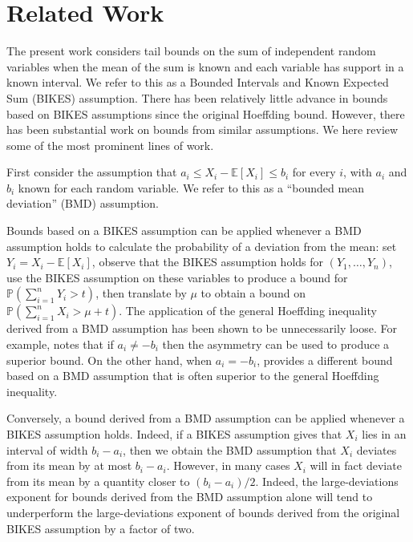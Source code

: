 \documentclass[12pt]{article}
\theoremstyle{plain}
\begin{document}
\section{Related Work}
\label{sec:related}

The present work considers tail bounds on the sum of independent random variables when the mean of the sum is known and each variable has support in a known interval.  We refer to this as a Bounded Intervals and Known Expected Sum (BIKES) assumption.  There has been relatively little advance in bounds based on BIKES assumptions since the original Hoeffding bound.  However, there has been substantial work on bounds from similar assumptions.  We here review some of the most prominent lines of work.

First consider the assumption that $a_i \leq X_i - \mathbb{E}[X_i] \leq b_i$ for every $i$, with $a_i$ and $b_i$ known for each random variable.  We refer to this as a ``bounded mean deviation'' (BMD) assumption.

Bounds based on a BIKES assumption can be applied whenever a BMD assumption holds to calculate the probability of a deviation from the mean: set $Y_i = X_i - \mathbb{E}[X_i]$, observe that the BIKES assumption holds for $(Y_1,\ldots,Y_n)$, use the BIKES assumption on these variables to produce a bound for $\mathbb{P}(\sum_{i=1}^n Y_i > t)$, then translate by $\mu$ to obtain a bound on $\mathbb{P}(\sum_{i=1}^n X_i > \mu+t)$.  The application of the general Hoeffding inequality derived from a BMD assumption has been shown to be unnecessarily loose.  For example, \citet{hertz2020improved} notes that if $a_i\neq -b_i$ then the asymmetry can be used to produce a superior bound.  On the other hand, when $a_i=-b_i$, \citet[Corollary 1.4]{bentkus2004hoeffding} provides a different bound based on a BMD assumption that is often superior to the general Hoeffding inequality.

Conversely, a bound derived from a BMD assumption can be applied whenever a BIKES assumption holds.  Indeed, if a BIKES assumption gives that $X_i$ lies in an interval of width $b_i-a_i$, then we obtain the BMD assumption that $X_i$ deviates from its mean by at most $b_i-a_i$.   However, in many cases $X_i$ will in fact deviate from its mean by a quantity closer to $(b_i-a_i)/2$.  Indeed, the large-deviations exponent for bounds derived from the BMD assumption alone will tend to underperform the large-deviations exponent of bounds derived from the original BIKES assumption by a factor of two.
\end{document}
